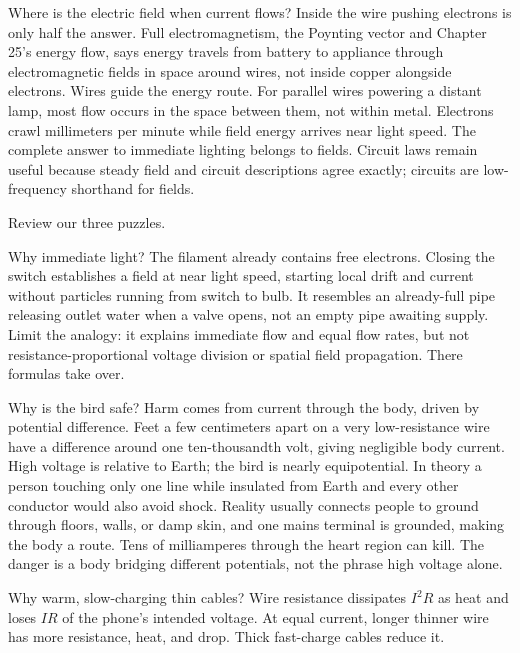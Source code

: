 \begin{challenge}
Where is the electric field when current flows? Inside the wire pushing electrons is only half the answer. Full electromagnetism, the Poynting vector and Chapter 25's energy flow, says energy travels from battery to appliance through electromagnetic fields in space around wires, not inside copper alongside electrons. Wires guide the energy route. For parallel wires powering a distant lamp, most flow occurs in the space between them, not within metal. Electrons crawl millimeters per minute while field energy arrives near light speed. The complete answer to immediate lighting belongs to fields. Circuit laws remain useful because steady field and circuit descriptions agree exactly; circuits are low-frequency shorthand for fields.
\end{challenge}


Review our three puzzles.

Why immediate light? The filament already contains free electrons. Closing the switch establishes a field at near light speed, starting local drift and current without particles running from switch to bulb. It resembles an already-full pipe releasing outlet water when a valve opens, not an empty pipe awaiting supply. Limit the analogy: it explains immediate flow and equal flow rates, but not resistance-proportional voltage division or spatial field propagation. There formulas take over.

Why is the bird safe? Harm comes from current through the body, driven by potential difference. Feet a few centimeters apart on a very low-resistance wire have a difference around one ten-thousandth volt, giving negligible body current. High voltage is relative to Earth; the bird is nearly equipotential. In theory a person touching only one line while insulated from Earth and every other conductor would also avoid shock. Reality usually connects people to ground through floors, walls, or damp skin, and one mains terminal is grounded, making the body a route. Tens of milliamperes through the heart region can kill. The danger is a body bridging different potentials, not the phrase high voltage alone.

Why warm, slow-charging thin cables? Wire resistance dissipates \(I^{2}R\) as heat and loses \(IR\) of the phone's intended voltage. At equal current, longer thinner wire has more resistance, heat, and drop. Thick fast-charge cables reduce it.

